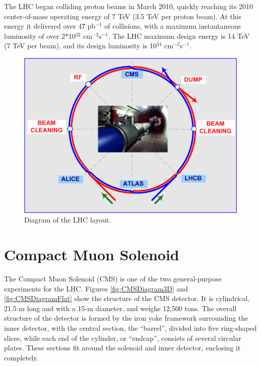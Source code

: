 The LHC began colliding proton beams in March 2010, 
quickly reaching its 2010 center-of-mass operating energy of 7 TeV
(3.5 TeV per proton beam).  
At this energy it delivered over 47 pb$^{-1}$ of collisions, 
with a maximum instantaneous luminosity of over 2*10$^{32}$ cm$^{-2}$s$^{-1}$.  %
The LHC maximum design energy is 14 TeV (7 TeV per beam), 
and its design luminosity is 10$^{34}$ cm$^{-2}$s$^{-1}$.  

 \begin{figure}[htb]
  \begin{center}
    \includegraphics[width=360pt]{Figures/lhc-schematic-ml.png} 
  \end{center}
  \caption[Diagram of the LHC layout]{Diagram of the LHC layout.}
  \label{fig:LHCDiagram}
 \end{figure}


\section{Compact Muon Solenoid}



The Compact Muon Solenoid (CMS) is one of the two general-purpose experiments for the LHC.  
Figures \ref{fig:CMSDiagram3D} and \ref{fig:CMSDiagramFlat} 
show the structure of the CMS detector.  
It is cylindrical, 21.5 m long and with a 15-m diameter, and weighs 12,500 tons.  
The overall structure of the detector is formed by the iron yoke framework surrounding the inner detector,
with the central section, the ``barrel'', divided into five ring-shaped slices, 
while each end of the cylinder, or ``endcap'', consists of several circular plates.  
These sections fit around the solenoid and inner detector, enclosing it completely.  

